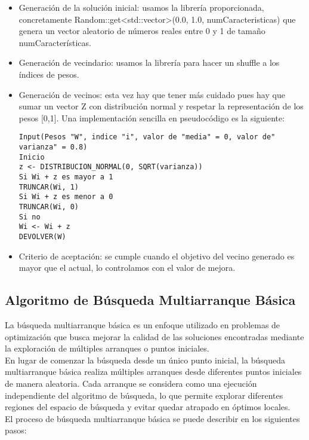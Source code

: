 \begin{itemize}
	\item Generación de la solución inicial: usamos la librería  proporcionada, concretamente Random::get<std::vector>(0.0, 1.0, numCaracteristicas) que genera un vector aleatorio de números reales entre 0 y 1 de tamaño numCaracterísticas.
	\item Generación de vecindario: usamos la librería  para hacer un shuffle a los índices de pesos.
	\item Generación de vecinos: esta vez hay que tener más cuidado pues hay que sumar un vector Z con distribución normal y respetar la representación de los pesos [0,1]. Una implementación sencilla en pseudocódigo es la siguiente:
	\begin{verbatim}
Input(Pesos "W", indice "i", valor de "media" = 0, valor de" varianza" = 0.8)
Inicio
z <- DISTRIBUCION_NORMAL(0, SQRT(varianza))
Si Wi + z es mayor a 1
TRUNCAR(Wi, 1)
Si Wi + z es menor a 0
TRUNCAR(Wi, 0)
Si no
Wi <- Wi + z
DEVOLVER(W)
	\end{verbatim}
	
	\item Criterio de aceptación: se cumple cuando el objetivo del vecino generado es mayor que el actual, lo controlamos con el valor de mejora.
\end{itemize}

\subsection{Algoritmo de Búsqueda Multiarranque Básica}
La búsqueda multiarranque básica es un enfoque utilizado en problemas de optimización que busca mejorar la calidad de las soluciones encontradas mediante la exploración de múltiples arranques o puntos iniciales.\\

En lugar de comenzar la búsqueda desde un único punto inicial, la búsqueda multiarranque básica realiza múltiples arranques desde diferentes puntos iniciales de manera aleatoria. Cada arranque se considera como una ejecución independiente del algoritmo de búsqueda, lo que permite explorar diferentes regiones del espacio de búsqueda y evitar quedar atrapado en óptimos locales.\\

El proceso de búsqueda multiarranque básica se puede describir en los siguientes pasos:

